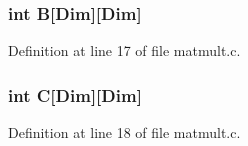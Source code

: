 \subsubsection[{B}]{\setlength{\rightskip}{0pt plus 5cm}int B[{\bf Dim}][{\bf Dim}]}\label{matmult_8c_a20f9296630a4c265942e40a30dd8d714}


Definition at line 17 of file matmult.\+c.

\subsubsection[{C}]{\setlength{\rightskip}{0pt plus 5cm}int C[{\bf Dim}][{\bf Dim}]}\label{matmult_8c_a1f6331cf1c81ed2fa412bd230c017a9c}


Definition at line 18 of file matmult.\+c.

